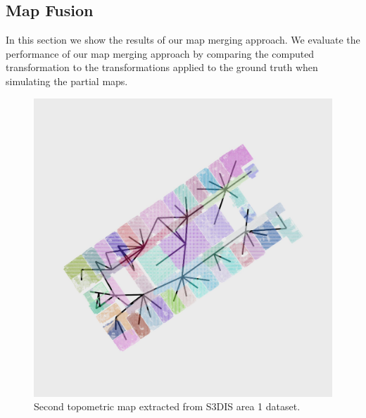 \pagebreak
\pagebreak

\subsection{Map Fusion}
In this section we show the results of our map merging approach. We evaluate the performance of our map merging approach by comparing the computed transformation to the transformations applied to the ground truth when simulating the partial maps. 

\begin{figure}[h]
    \centering
    \includegraphics*[width=.6\textwidth]{./fig/area_1_global.jpg}
    \caption{Second topometric map extracted from S3DIS area 1 dataset.}
    \label{fig:area_1_match_02}
\end{figure}

